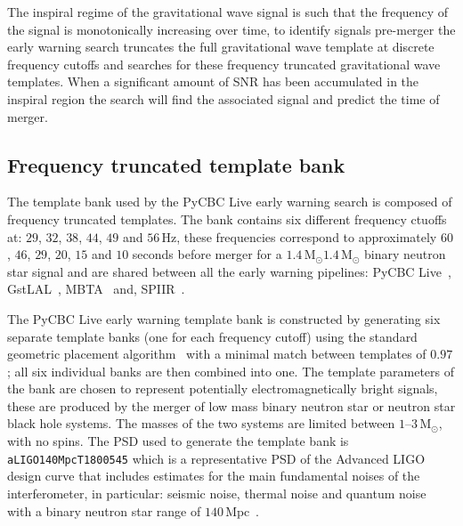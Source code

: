 The inspiral regime of the gravitational wave signal is such that the frequency of the signal is monotonically increasing over time, to identify signals pre-merger the early warning search truncates the full gravitational wave template at discrete frequency cutoffs and searches for these frequency truncated gravitational wave templates. When a significant amount of SNR has been accumulated in the inspiral region the search will find the associated signal and predict the time of merger.

\subsection{\label{6:sec:early-warning-template-bank}Frequency truncated template bank}

The template bank used by the PyCBC Live early warning search is composed of frequency truncated templates. The bank contains six different frequency ctuoffs at: $29$, $32$, $38$, $44$, $49$ and $56 \, \text{Hz}$, these frequencies correspond to approximately $60$, $46$, $29$, $20$, $15$ and $10$ seconds before merger for a $1.4 \, \text{M$_\odot$}$\text{--}$1.4\, \text{M$_\odot$}$ binary neutron star signal and are shared between all the early warning pipelines: PyCBC Live~\cite{PyCBC_earlywarning:2020}, GstLAL~\cite{GstLAL:2020}, MBTA~\cite{MBTA:2021} and, SPIIR~\cite{SPIIR:2020}.

The PyCBC Live early warning template bank is constructed by generating six separate template banks (one for each frequency cutoff) using the standard geometric placement algorithm~\cite{Brown:2012} with a minimal match between templates of $0.97$; all six individual banks are then combined into one. The template parameters of the bank are chosen to represent potentially electromagnetically bright signals, these are produced by the merger of low mass binary neutron star or neutron star black hole systems. The masses of the two systems are limited between $1\text{--}3 \, \text{M$_\odot$}$, with no spins. The PSD used to generate the template bank is \verb|aLIGO140MpcT1800545| which is a representative PSD of the Advanced LIGO design curve that includes estimates for the main fundamental noises of the interferometer, in particular: seismic noise, thermal noise and quantum noise~\cite{aLIGO_design_curve:2018} with a binary neutron star range of $140 \, \text{Mpc}$~\cite{ligo_prospects:2016}.

